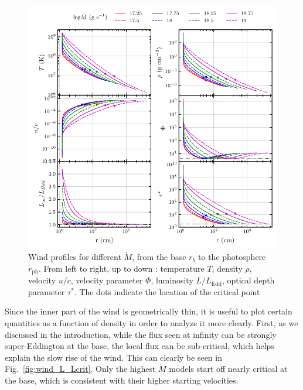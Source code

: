 \documentclass[../main.tex]{subfiles}
\newcommand{\ph}{_\text{ph}}
\newcommand{\Ledd}{L_\text{Edd}}
\newcommand{\Mdot}{\dot{M}}
\begin{document}
\begin{figure}
    \centering
    \includegraphics[width=\textwidth]{figures/wind_profiles.pdf}
    \caption{Wind profiles for different $\Mdot$, from the base $r_b$ to the photosphere $r\ph$. From left to right, up to down : temperature $T$, density $\rho$, velocity $u/c$, velocity parameter $\Phi$, luminosity $L/\Ledd$, optical depth parameter $\tau^*$. The dots indicate the location of the critical point}
    \label{fig:wind_profiles}
\end{figure}

Since the inner part of the wind is geometrically thin, it is useful to plot certain quantities as a function of density in order to analyze it more clearly. First, as we discussed in the introduction, while the flux seen at infinity can be strongly super-Eddington at the base, the local flux can be sub-critical, which helps explain the slow rise of the wind. This can clearly be seen in Fig.~\ref{fig:wind_L_Lcrit}. Only the highest $\Mdot$ models start off nearly critical at the base, which is consistent with their higher starting velocities.\\
\end{document}
